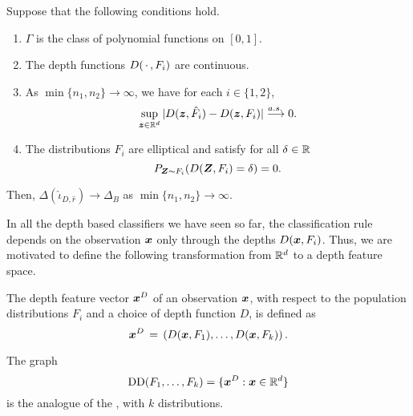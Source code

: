 \begin{lemma}
    Suppose that the following conditions hold.
    \vspace{-1em}
    \begin{enumerate}[itemsep = -0.2em]
        \item $\Gamma$ is the class of polynomial functions on $[0, 1]$.
        \item The depth functions $D(\,\cdot\,, F_i)$ are continuous.
        \item As $\min\{n_1, n_2\} \to \infty$, we have for each $i \in \{1, 2\}$,
        \begin{equation}
            \sup_{\bm{z} \in \mathbb{R}^d} |D(\bm{z}, \hat{F}_i) - D(\bm{z}, F_i)| \overset{a.s.\,}{\longrightarrow} 0.
        \end{equation}
        \item The distributions $F_i$ are elliptical and satisfy for all
        $\delta \in \mathbb{R}$
        \begin{equation}
            P_{\bm{Z} \sim F_i}(D(\bm{Z}, F_i) = \delta) = 0.
        \end{equation}
    \end{enumerate}
    Then, $\Delta(\hat{\iota}_{D, \hat{r}}) \to \Delta_B$ as $\min\{n_1, n_2\}
    \to \infty$.
\end{lemma}

In all the depth based classifiers we have seen so far, the classification
rule depends on the observation $\bm{x}$ only through the depths $D(\bm{x}, F_i)$.
Thus, we are motivated to define the following transformation from $\mathbb{R}^d$ to a
depth feature space.

\begin{definition}
    The depth feature vector $\bm{x}^D$ of an observation $\bm{x}$, with respect to
    the population distributions $F_i$ and a choice of depth function $D$, is
    defined as
    \begin{equation}
        \bm{x}^D \,=\, \left(D(\bm{x}, F_1), \dots, D(\bm{x}, F_k)\right).
    \end{equation}
\end{definition}
\begin{remark}
    The graph
    \begin{equation}
        \operatorname{DD}(F_1, \dots, F_k) = \{\bm{x}^D : \bm{x} \in \mathbb{R}^d\}
    \end{equation}
    is the analogue of the , with $k$ distributions.
\end{remark}

